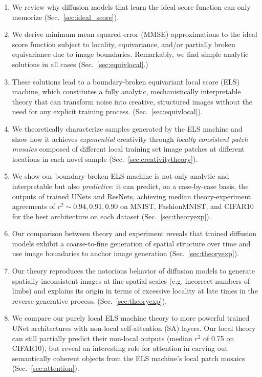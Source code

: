 \documentclass{article}
\theoremstyle{plain}
\theoremstyle{definition}
\theoremstyle{remark}
\begin{document}
\begin{enumerate}[itemsep=-1pt]
    \item We review why diffusion models that learn the ideal score function can only memorize (Sec.~\ref{sec:ideal_score}).
    \item We derive minimum mean squared error (MMSE) approximations to the ideal score function subject to locality, equivariance, and/or partially broken equivariance due to image boundaries.   Remarkably, we find simple analytic solutions in all cases (Sec.~\ref{sec:equivlocal}.)
    \item These solutions lead to a boundary-broken equivariant local score (ELS) machine, which constitutes a fully analytic, mechanistically interpretable theory that can transform noise into creative, structured images without the need for any explicit training process. (Sec.~\ref{sec:equivlocal}).
    \item We theoretically characterize samples generated by the ELS machine and show how it achieves {\it exponential} creativity through {\it locally consistent patch mosaics} composed of different local training set image patches at different locations in each novel sample (Sec.~\ref{sec:creativitytheory}). 
    \item We show our boundary-broken ELS machine is not only analytic and interpretable but also {\it predictive}: it can predict, on a case-by-case basis, the outputs of trained UNets and ResNets, achieving median theory-experiment agreements of $r^2 \sim 0.94, 0.91, 0.90$ on MNIST, FashionMNIST, and CIFAR10 for the best architecture on each dataset (Sec.~\ref{sec:theoryexp}).
    \item Our comparison between theory and experiment reveals that trained diffusion models exhibit a coarse-to-fine generation of spatial structure over time and use image boundaries to anchor image generation (Sec.~\ref{sec:theoryexp}).
    \item Our theory reproduces the notorious behavior of diffusion models to generate spatially inconsistent images at fine spatial scales (e.g. incorrect numbers of limbs) and explains its origin in terms of excessive locality at late times in the reverse generative process. (Sec.~\ref{sec:theoryexp}).
    \item We compare our purely local ELS machine theory to more powerful trained UNet architectures with non-local self-attention (SA) layers. Our local theory can still partially predict their non-local outputs (median $r^2$ of 0.75 on CIFAR10), but reveal an interesting role for attention in carving out semantically coherent objects from the ELS machine's local patch mosaics (Sec.~\ref{sec:attention}). 
\end{enumerate}
\end{document}
